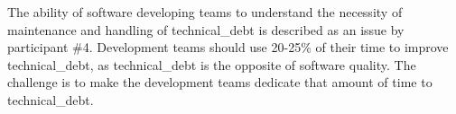 The ability of software developing teams to understand the necessity of maintenance and handling of \gls{technical_debt} is described as an issue by participant \#4. Development teams should use 20-25\% of their time to improve \gls{technical_debt}, as \gls{technical_debt} is the opposite of software quality. The challenge is to make the development teams dedicate that amount of time to \gls{technical_debt}.





